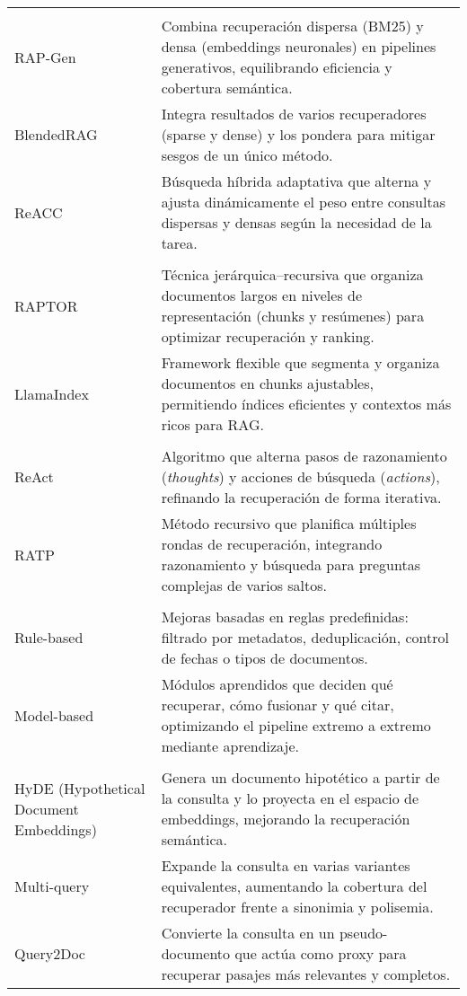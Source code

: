 \begin{tabularx}{\textwidth}{>{\raggedright\arraybackslash}p{} X}
\midrule
\multicolumn{2}{l}{\textit{Hybrid Search}}\\
RAP-Gen &
Combina recuperación dispersa (BM25) y densa (embeddings neuronales) en pipelines generativos, equilibrando eficiencia y cobertura semántica. \\
BlendedRAG &
Integra resultados de varios recuperadores (sparse y dense) y los pondera para mitigar sesgos de un único método. \\
ReACC &
Búsqueda híbrida adaptativa que alterna y ajusta dinámicamente el peso entre consultas dispersas y densas según la necesidad de la tarea. \\

\midrule
\multicolumn{2}{l}{\textit{Chunk Optimization}}\\
RAPTOR &
Técnica jerárquica–recursiva que organiza documentos largos en niveles de representación (chunks y resúmenes) para optimizar recuperación y ranking. \\
LlamaIndex &
Framework flexible que segmenta y organiza documentos en chunks ajustables, permitiendo índices eficientes y contextos más ricos para RAG. \\

\midrule
\multicolumn{2}{l}{\textit{Recursive Retrieval}}\\
ReAct &
Algoritmo que alterna pasos de razonamiento (\textit{thoughts}) y acciones de búsqueda (\textit{actions}), refinando la recuperación de forma iterativa. \\
RATP &
Método recursivo que planifica múltiples rondas de recuperación, integrando razonamiento y búsqueda para preguntas complejas de varios saltos. \\

\midrule
\multicolumn{2}{l}{\textit{RAG Pipeline Enhancement}}\\
Rule-based &
Mejoras basadas en reglas predefinidas: filtrado por metadatos, deduplicación, control de fechas o tipos de documentos. \\
Model-based &
Módulos aprendidos que deciden qué recuperar, cómo fusionar y qué citar, optimizando el pipeline extremo a extremo mediante aprendizaje. \\

\midrule
\multicolumn{2}{l}{\textit{Query Reformulation}}\\
HyDE (Hypothetical Document Embeddings) &
Genera un documento hipotético a partir de la consulta y lo proyecta en el espacio de embeddings, mejorando la recuperación semántica. \\
Multi-query &
Expande la consulta en varias variantes equivalentes, aumentando la cobertura del recuperador frente a sinonimia y polisemia. \\
Query2Doc &
Convierte la consulta en un pseudo-documento que actúa como proxy para recuperar pasajes más relevantes y completos. \\
\end{tabularx}

